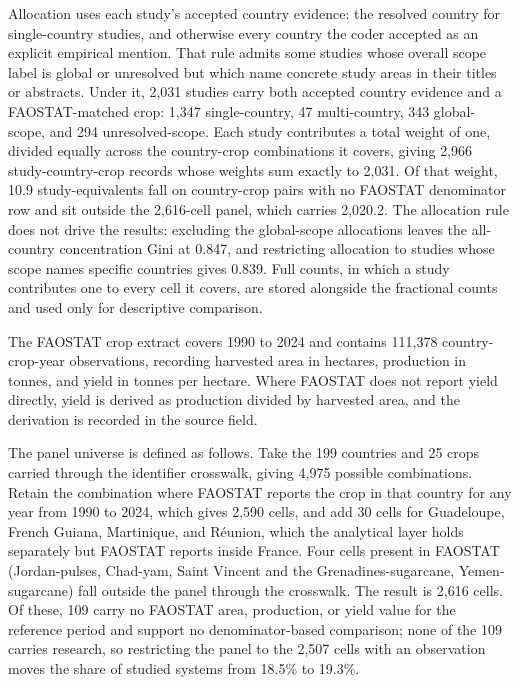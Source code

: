 \documentclass[ASNA,twocolumn]{USG}
\makeatletter
\newcommand{\applabel}[2]{\phantomsection\edef\@currentlabel{#1}\label{#2}}
\makeatother
\begin{document}
Allocation uses each study's accepted country evidence: the resolved country for single-country
studies, and otherwise every country the coder accepted as an explicit empirical mention. That rule admits some studies whose overall scope label is global or
unresolved but which name concrete study areas in their titles or abstracts. Under it, 2,031
studies carry both accepted country evidence and a FAOSTAT-matched crop: 1,347
single-country, 47 multi-country, 343 global-scope, and 294 unresolved-scope. Each study
contributes a total weight of one, divided equally across the country-crop combinations it
covers, giving 2,966 study-country-crop records whose weights sum exactly to 2,031. Of that
weight, 10.9 study-equivalents fall on country-crop pairs with no FAOSTAT denominator row
and sit outside the 2,616-cell panel, which carries 2,020.2. The allocation rule does not
drive the results: excluding the global-scope allocations leaves the all-country
concentration Gini at 0.847, and restricting allocation to studies whose scope names
specific countries gives 0.839. Full counts, in which a study contributes one to every cell
it covers, are stored alongside the fractional counts and used only for descriptive
comparison.

\applabel{Appendix C}{app:variables}


The FAOSTAT crop extract covers 1990 to 2024 and contains 111,378 country-crop-year
observations, recording harvested area in hectares, production in tonnes, and yield in tonnes
per hectare. Where FAOSTAT does not report yield directly, yield is derived as production
divided by harvested area, and the derivation is recorded in the source field.

The panel universe is defined as follows. Take the 199 countries and 25 crops carried through
the identifier crosswalk, giving 4,975 possible combinations. Retain the combination where
FAOSTAT reports the crop in that country for any year from 1990 to 2024, which gives 2,590 cells,
and add 30 cells for Guadeloupe, French Guiana, Martinique, and R\'eunion, which the analytical
layer holds separately but FAOSTAT reports inside France. Four cells present in FAOSTAT
(Jordan-pulses, Chad-yam, Saint Vincent and the Grenadines-sugarcane, Yemen-sugarcane) fall
outside the panel through the crosswalk. The result is 2,616 cells. Of these, 109 carry no
FAOSTAT area, production, or yield value for the reference period and support no
denominator-based comparison; none of the 109 carries research, so restricting the panel to the
2,507 cells with an observation moves the share of studied systems from 18.5\% to 19.3\%.
\end{document}
